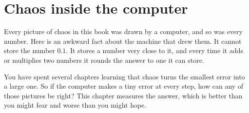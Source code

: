 
\chapter{Chaos inside the computer}
\label{ch:computers}

\noindent
Every picture of chaos in this book was drawn by a computer, and so was
every number. Here is an awkward fact about the machine that drew them. It
cannot store the number $\num{0.1}$. It stores a number very close to it, and
every time it adds or multiplies two numbers it rounds the answer to one it
can store.

You have spent several chapters learning that chaos turns the smallest error
into a large one. So if the computer makes a tiny error at every step, how
can any of those pictures be right? This chapter measures the answer, which
is better than you might fear and worse than you might hope.

\begin{outcomes}
\end{outcomes}


